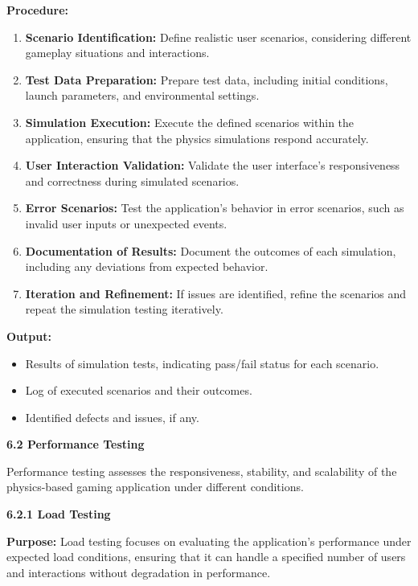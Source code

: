 \documentclass[
]{article}
\begin{document}
\textbf{Procedure:}

\begin{enumerate}
\def\labelenumi{\arabic{enumi}.}
\item
  \textbf{Scenario Identification:} Define realistic user scenarios,
  considering different gameplay situations and interactions.
\item
  \textbf{Test Data Preparation:} Prepare test data, including initial
  conditions, launch parameters, and environmental settings.
\item
  \textbf{Simulation Execution:} Execute the defined scenarios within
  the application, ensuring that the physics simulations respond
  accurately.
\item
  \textbf{User Interaction Validation:} Validate the user interface's
  responsiveness and correctness during simulated scenarios.
\item
  \textbf{Error Scenarios:} Test the application's behavior in error
  scenarios, such as invalid user inputs or unexpected events.
\item
  \textbf{Documentation of Results:} Document the outcomes of each
  simulation, including any deviations from expected behavior.
\item
  \textbf{Iteration and Refinement:} If issues are identified, refine
  the scenarios and repeat the simulation testing iteratively.
\end{enumerate}

\textbf{Output:}

\begin{itemize}
\item
  Results of simulation tests, indicating pass/fail status for each
  scenario.
\item
  Log of executed scenarios and their outcomes.
\item
  Identified defects and issues, if any.
\end{itemize}

\textbf{6.2 Performance Testing}

Performance testing assesses the responsiveness, stability, and
scalability of the physics-based gaming application under different
conditions.

\textbf{6.2.1 Load Testing}

\textbf{Purpose:} Load testing focuses on evaluating the application's
performance under expected load conditions, ensuring that it can handle
a specified number of users and interactions without degradation in
performance.
\end{document}
